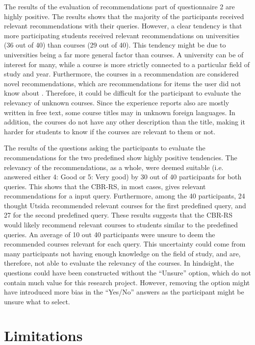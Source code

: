The results of the evaluation of recommendations part of questionnaire 2 are highly positive. The results shows that the majority of the participants received relevant recommendations with their queries. However, a clear tendency is that more participating students received relevant recommendations on universities (36 out of 40) than courses (29 out of 40). This tendency might be due to universities being a far more general factor than courses. A university can be of interest for many, while a course is more strictly connected to a particular field of study and year. Furthermore, the courses in a recommendation are considered novel recommendations, which are recommendations for items the user did not know about \cite{shani2011evaluating}. Therefore, it could be difficult for the participant to evaluate the relevancy of unknown courses. Since the experience reports also are mostly written in free text, some course titles may in unknown foreign languages. In addition, the courses do not have any other description than the title, making it harder for students to know if the courses are relevant to them or not. 

The results of the questions asking the participants to evaluate the recommendations for the two predefined show highly positive tendencies. The relevancy of the recommendations, as a whole, were deemed suitable (i.e. answered either 4: Good or 5: Very good) by 30 out of 40 participants for both queries. This shows that the CBR-RS, in most cases, gives relevant recommendations for a input query. Furthermore, among the 40 participants, 24 thought Utsida recommended relevant courses for the first predefined query, and 27 for the second predefined query. These results suggests that the CBR-RS would likely recommend relevant courses to students similar to the predefined queries. An average of 10 out 40 participants were unsure to deem the recommended courses relevant for each query. This uncertainty could come from many participants not having enough knowledge on the field of study, and are, therefore, not able to evaluate the relevancy of the courses. In hindsight, the questions could have been constructed without the \enquote{Unsure} option, which do not contain much value for this research project. However, removing the option might have introduced more bias in the \enquote{Yes/No} answers as the participant might be unsure what to select. 

\section{Limitations}\label{sec:limitations}

